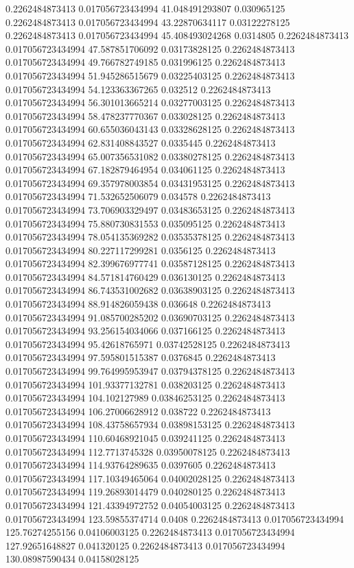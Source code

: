 0.2262484873413 0.017056723434994 41.048491293807 0.030965125
0.2262484873413 0.017056723434994 43.22870634117 0.03122278125
0.2262484873413 0.017056723434994 45.408493024268 0.0314805
0.2262484873413 0.017056723434994 47.587851706092 0.03173828125
0.2262484873413 0.017056723434994 49.766782749185 0.031996125
0.2262484873413 0.017056723434994 51.945286515679 0.03225403125
0.2262484873413 0.017056723434994 54.123363367265 0.032512
0.2262484873413 0.017056723434994 56.301013665214 0.03277003125
0.2262484873413 0.017056723434994 58.478237770367 0.033028125
0.2262484873413 0.017056723434994 60.655036043143 0.03328628125
0.2262484873413 0.017056723434994 62.831408843527 0.0335445
0.2262484873413 0.017056723434994 65.007356531082 0.03380278125
0.2262484873413 0.017056723434994 67.182879464954 0.034061125
0.2262484873413 0.017056723434994 69.357978003854 0.03431953125
0.2262484873413 0.017056723434994 71.532652506079 0.034578
0.2262484873413 0.017056723434994 73.706903329497 0.03483653125
0.2262484873413 0.017056723434994 75.880730831553 0.035095125
0.2262484873413 0.017056723434994 78.054135369282 0.03535378125
0.2262484873413 0.017056723434994 80.227117299281 0.0356125
0.2262484873413 0.017056723434994 82.399676977741 0.03587128125
0.2262484873413 0.017056723434994 84.571814760429 0.036130125
0.2262484873413 0.017056723434994 86.743531002682 0.03638903125
0.2262484873413 0.017056723434994 88.914826059438 0.036648
0.2262484873413 0.017056723434994 91.085700285202 0.03690703125
0.2262484873413 0.017056723434994 93.256154034066 0.037166125
0.2262484873413 0.017056723434994 95.42618765971 0.03742528125
0.2262484873413 0.017056723434994 97.595801515387 0.0376845
0.2262484873413 0.017056723434994 99.764995953947 0.03794378125
0.2262484873413 0.017056723434994 101.93377132781 0.038203125
0.2262484873413 0.017056723434994 104.102127989 0.03846253125
0.2262484873413 0.017056723434994 106.27006628912 0.038722
0.2262484873413 0.017056723434994 108.43758657934 0.03898153125
0.2262484873413 0.017056723434994 110.60468921045 0.039241125
0.2262484873413 0.017056723434994 112.7713745328 0.03950078125
0.2262484873413 0.017056723434994 114.93764289635 0.0397605
0.2262484873413 0.017056723434994 117.10349465064 0.04002028125
0.2262484873413 0.017056723434994 119.26893014479 0.040280125
0.2262484873413 0.017056723434994 121.43394972752 0.04054003125
0.2262484873413 0.017056723434994 123.59855374714 0.0408
0.2262484873413 0.017056723434994 125.76274255156 0.04106003125
0.2262484873413 0.017056723434994 127.92651648827 0.041320125
0.2262484873413 0.017056723434994 130.08987590434 0.04158028125
